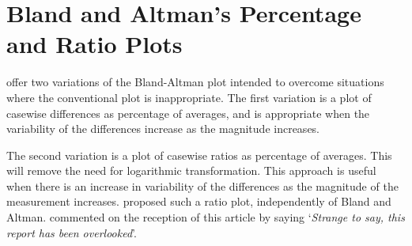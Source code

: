 \documentclass[12pt, a4paper]{report}
\theoremstyle{plain}
\theoremstyle{definition}
\theoremstyle{remark}
\begin{document}
	\section*{Bland and Altman's Percentage and Ratio Plots}
	\citet{BA99} offer two variations of the Bland-Altman plot intended to overcome situations where the conventional plot is inappropriate. The first variation is a plot of casewise differences as percentage of averages, and is appropriate when the variability of the differences increase as the
	magnitude increases. 
	
	The second variation is a plot of casewise ratios as percentage of averages. This will remove the need for
	logarithmic transformation. This approach is useful when there is an increase in variability of the differences as the magnitude of the measurement increases. \citet{Eksborg} proposed such a ratio plot,
	independently of Bland and Altman. \citet{Dewitte} commented on
	the reception of this article by saying `\textit{Strange to say, this 
		report has been overlooked}'.
	
	
	
	
\end{document}
